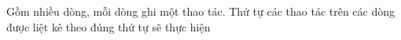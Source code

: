 Gồm nhiều dòng, mỗi dòng ghi một thao tác. Thứ tự các thao tác trên các dòng được liệt kê theo đúng thứ tự sẽ thực hiện  

\